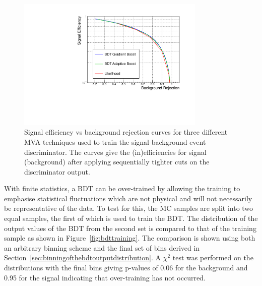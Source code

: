 \begin{figure}
\begin{center}
  \includegraphics[width=0.8\textwidth]{hgg7TeV/sidebandMvaPlots/roc}
\end{center}
 \caption{Signal efficiency vs background rejection curves for three different MVA techniques used to train
 the signal-background event discriminator. The curves give the (in)efficiencies for signal (background) 
 after applying sequentially tighter cuts on the discriminator output.}
 \label{fig:mvacomparisons}
\end{figure}

With finite statistics, a BDT can be over-trained by allowing the training to emphasise statistical fluctuations which are not physical and will not necessarily be
representative of the data. To test for this, the MC samples are split into two equal samples, the first of which is used to train the BDT. The distribution 
of the output values of the BDT from the second set is compared to that of the training sample as shown in Figure~\ref{fig:bdttraining}. The comparison
is shown using both an arbitrary binning scheme and the final set of bins derived in 
Section~\ref{sec:binningofthebdtoutputdistribution}.
A $\chi^{2}$ test was performed on the distributions with the final bins giving p-values of 0.06
for the background and 0.95 for the signal indicating that over-training has not occurred.

